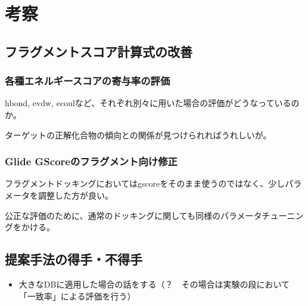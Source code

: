 \chapter{考察}

\section{フラグメントスコア計算式の改善}
\subsection{各種エネルギースコアの寄与率の評価}
hbond, evdw, ecoulなど、それぞれ別々に用いた場合の評価がどうなっているのか。

ターゲットの正解化合物の傾向との関係が見つけられればうれしいが。
\subsection{Glide GScoreのフラグメント向け修正}
フラグメントドッキングにおいてはgscoreをそのまま使うのではなく、少しパラメータを調整した方が良い。

公正な評価のために、通常のドッキングに関しても同様のパラメータチューニングをかける。

\section{提案手法の得手・不得手}

\begin{itemize}
\item 大きなDBに適用した場合の話をする（？　その場合は実験の段において「一致率」による評価を行う）
\end{itemize}
